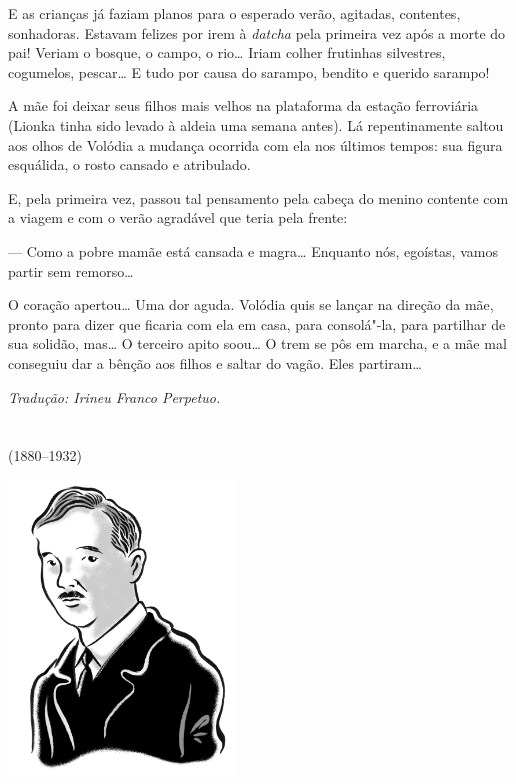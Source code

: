 E as crianças já faziam planos para o esperado verão, agitadas,
contentes, sonhadoras. Estavam felizes por irem à \emph{datcha} pela
primeira vez após a morte do pai! Veriam o bosque, o campo, o rio\ldots{}
Iriam colher frutinhas silvestres, cogumelos, pescar\ldots{} E tudo por causa
do sarampo, bendito e querido sarampo!

A mãe foi deixar seus filhos mais velhos na plataforma da estação
ferroviária (Lionka tinha sido levado à aldeia uma semana antes). Lá
repentinamente saltou aos olhos de Volódia a mudança ocorrida com ela
nos últimos tempos: sua figura esquálida, o rosto cansado e atribulado.

E, pela primeira vez, passou tal pensamento pela cabeça do menino
contente com a viagem e com o verão agradável que teria pela frente:

--- Como a pobre mamãe está cansada e magra\ldots{} Enquanto nós, egoístas,
vamos partir sem remorso\ldots{}

O coração apertou\ldots{} Uma dor aguda. Volódia quis se lançar na direção da
mãe, pronto para dizer que ficaria com ela em casa, para consolá"-la,
para partilhar de sua solidão, mas\ldots{} O terceiro apito soou\ldots{} O trem se
pôs em marcha, e a mãe mal conseguiu dar a bênção aos filhos e saltar do
vagão. Eles partiram\ldots{}

\medskip

{\footnotesize\hfill\emph{Tradução: Irineu Franco Perpetuo.}}


\chapter*{}
\label{part14}
\thispagestyle{empty}

\begin{vplace}[1.5]
{\HUGES\hfill{}}

{\LARGE\hfill\textlt(1880–1932)}
\end{vplace}

\pagebreak
\thispagestyle{empty}
\mbox{}
\vfill
\begin{center}
\includegraphics[width=6cm]{./imgs/autor11.jpg}
\end{center}

